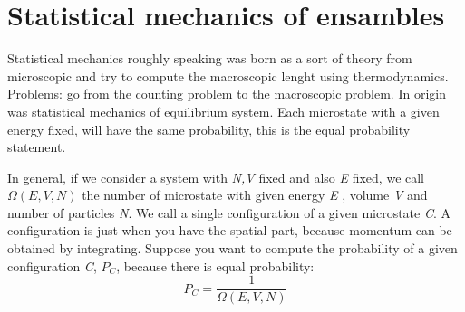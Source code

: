 \documentclass[../main/main.tex]{subfiles}
\begin{document}

\section{Statistical mechanics of ensambles}

Statistical mechanics roughly speaking was born as a sort of theory from microscopic and try to compute the macroscopic lenght using thermodynamics. Problems: go from the counting problem to the macroscopic problem.
In origin was statistical mechanics of equilibrium system.
Each microstate with a given energy fixed, will have the same probability, this is the equal probability statement.

In general, if we consider a system with \emph{N,V} fixed and also \emph{E} fixed, we call \( \Omega (E,V,N) \)  the number of microstate with given energy \emph{E} , volume \emph{V} and number of particles \emph{N}.
We call  a single configuration of a given microstate \emph{C}. A configuration is just when you have the spatial part, because momentum can be obtained by integrating.
Suppose you want to compute the probability of a given configuration \emph{C}, \( P_C \), because there is equal probability:
\begin{equation}
  P_C = \frac{1}{\Omega (E,V,N)}
  \label{eq:}
\end{equation}
\end{document}
